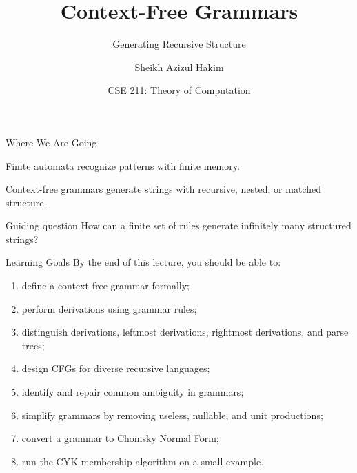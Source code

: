\documentclass[aspectratio=169,10pt]{beamer}
\title{Context-Free Grammars}
\subtitle{Generating Recursive Structure}
\author{Sheikh Azizul Hakim}
\institute{Department of Computer Science and Engineering, BUET}
\date{CSE 211: Theory of Computation}
\begin{document}
\begin{frame}
    \titlepage
\end{frame}

\begin{frame}{Where We Are Going}
\centering
{}

\vspace{1em}
Finite automata recognize patterns with finite memory.

\vspace{0.5em}
Context-free grammars generate strings with recursive, nested, or matched structure.

\begin{alertblock}{Guiding question}
How can a finite set of rules generate infinitely many structured strings?
\end{alertblock}
\end{frame}

\begin{frame}{Learning Goals}
By the end of this lecture, you should be able to:

\begin{enumerate}
    \item define a context-free grammar formally;
    \item perform derivations using grammar rules;
    \item distinguish derivations, leftmost derivations, rightmost derivations, and parse trees;
    \item design CFGs for diverse recursive languages;
    \item identify and repair common ambiguity in grammars;
    \item simplify grammars by removing useless, nullable, and unit productions;
    \item convert a grammar to Chomsky Normal Form;
    \item run the CYK membership algorithm on a small example.
\end{enumerate}
\end{frame}
\end{document}
